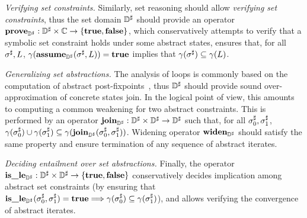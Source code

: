 \begin{asparaitem}
\item \emph{Verifying set constraints.}
  Similarly, set reasoning should allow {\em verifying
    set constraints}, thus the set domain \( {\mathbb{D}}^{\sharp} \) should provide an operator
  \( \textbf{prove}_{{\mathbb{D}}^{\sharp}}: {\mathbb{D}}^{\sharp} \times \mathbb{C} \rightarrow \{ \mathbf{true}, \mathbf{false} \} \),
  which conservatively attempts to verify that a symbolic set constraint
  holds under some abstract states, \ie ensures that, for all \( {\sigma}^{\sharp},
  L \), \( \gamma( \textbf{assume}_{{\mathbb{D}}^{\sharp}}( {\sigma}^{\sharp}, L ) ) = \mathbf{true} \) implies that
  \( \gamma( {\sigma}^{\sharp} ) \subseteq \gamma( L ) \).

\item \emph{Generalizing set abstractions.}
  The analysis of loops is commonly based on the computation of abstract
  post-fixpoints~\cite{cc:popl:77}, thus \( {\mathbb{D}}^{\sharp} \) should provide
  sound over-approximation of concrete states join.
  In the logical point of view, this amounts to computing a common weakening
  for two abstract constraints.
  This is performed by an operator \( \textbf{join}_{{\mathbb{D}}^{\sharp}}: {\mathbb{D}}^{\sharp} \times {\mathbb{D}}^{\sharp}
  \rightarrow {\mathbb{D}}^{\sharp} \) such that, for all \( {\sigma}^{\sharp}_0, {\sigma}^{\sharp}_1 \),
  \( \gamma( {\sigma}^{\sharp}_0 ) \cup \gamma( {\sigma}^{\sharp}_1 ) \subseteq
  \gamma( \textbf{join}_{{\mathbb{D}}^{\sharp}}( {\sigma}^{\sharp}_0, {\sigma}^{\sharp}_1 ) ) \).
  Widening operator \( \textbf{widen}_{{\mathbb{D}}^{\sharp}} \) should satisfy the same property
  and ensure termination of any sequence of abstract iterates.

\item \emph{Deciding entailment over set abstractions.}
  Finally, the operator \( \textbf{is\_le}_{{\mathbb{D}}^{\sharp}}: {\mathbb{D}}^{\sharp} \times {\mathbb{D}}^{\sharp} \rightarrow \{ \mathbf{true},
  \mathbf{false} \} \) conservatively decides implication among abstract set
  constraints (by ensuring that \( \textbf{is\_le}_{{\mathbb{D}}^{\sharp}}( {\sigma}^{\sharp}_0, {\sigma}^{\sharp}_1 ) =
  \mathbf{true} \Longrightarrow \gamma( {\sigma}^{\sharp}_0 ) \subseteq \gamma(
  {\sigma}^{\sharp}_1 ) \)), and allows verifying the convergence of abstract
  iterates.
\end{asparaitem}
